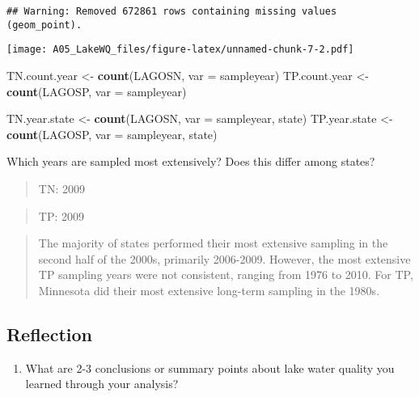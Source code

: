 \documentclass[]{article}
\newenvironment{Shaded}{\begin{snugshade}}{\end{snugshade}}
\newcommand{\DataTypeTok}[1]{\textcolor[rgb]{0.13,0.29,0.53}{#1}}
\newcommand{\KeywordTok}[1]{\textcolor[rgb]{0.13,0.29,0.53}{\textbf{#1}}}
\newcommand{\NormalTok}[1]{#1}
\newcommand{\StringTok}[1]{\textcolor[rgb]{0.31,0.60,0.02}{#1}}
\providecommand{\tightlist}{%
  \setlength{\itemsep}{0pt}\setlength{\parskip}{0pt}}
\begin{document}
\begin{verbatim}
## Warning: Removed 672861 rows containing missing values (geom_point).
\end{verbatim}

\texttt{[image: A05\_LakeWQ\_files/figure-latex/unnamed-chunk-7-2.pdf]}

\begin{Shaded}
\begin{Highlighting}[]
\NormalTok{TN.count.year <-}\StringTok{ }\KeywordTok{count}\NormalTok{(LAGOSN, }\DataTypeTok{var =}\NormalTok{ sampleyear)}
\NormalTok{TP.count.year <-}\StringTok{ }\KeywordTok{count}\NormalTok{(LAGOSP, }\DataTypeTok{var =}\NormalTok{ sampleyear)}

\NormalTok{TN.year.state <-}\StringTok{ }\KeywordTok{count}\NormalTok{(LAGOSN, }\DataTypeTok{var =}\NormalTok{ sampleyear, state)}
\NormalTok{TP.year.state <-}\StringTok{ }\KeywordTok{count}\NormalTok{(LAGOSP, }\DataTypeTok{var =}\NormalTok{ sampleyear, state)}
\end{Highlighting}
\end{Shaded}

Which years are sampled most extensively? Does this differ among states?

\begin{quote}
TN: 2009
\end{quote}

\begin{quote}
TP: 2009
\end{quote}

\begin{quote}
The majority of states performed their most extensive sampling in the
second half of the 2000s, primarily 2006-2009. However, the most
extensive TP sampling years were not consistent, ranging from 1976 to
2010. For TP, Minnesota did their most extensive long-term sampling in
the 1980s.
\end{quote}

\hypertarget{reflection}{%
\subsection{Reflection}\label{reflection}}

\begin{enumerate}
\def\labelenumi{\arabic{enumi}.}
\setcounter{enumi}{11}
\tightlist
\item
  What are 2-3 conclusions or summary points about lake water quality
  you learned through your analysis?
\end{enumerate}
\end{document}
